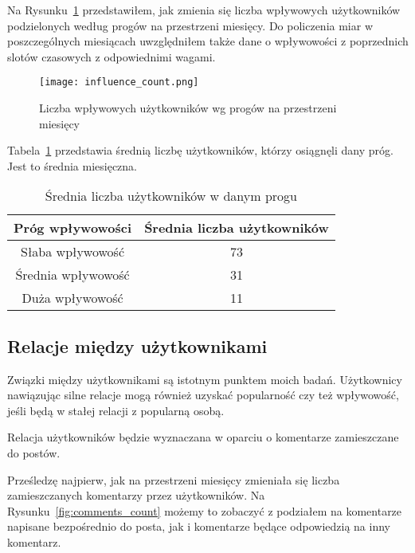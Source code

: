 \documentclass[polish,12pt]{aghthesis}
\begin{document}
Na Rysunku~\ref{fig:inf_count} przedstawiłem, jak zmienia się liczba wpływowych użytkowników podzielonych według progów na przestrzeni miesięcy. Do policzenia miar w poszczególnych miesiącach uwzględniłem także dane o wpływowości z poprzednich slotów czasowych z odpowiednimi wagami.

\begin{figure}[ht]
    \centering
    \texttt{[image: influence\_count.png]}
    \caption[Liczba wpływowych użytkowników wg progów na przestrzeni miesięcy]{Liczba wpływowych użytkowników wg progów na przestrzeni miesięcy}
    \label{fig:inf_count}
\end{figure}

\FloatBarrier

Tabela~\ref{tab:popul_count2} przedstawia średnią liczbę użytkowników, którzy osiągnęli dany próg. Jest to średnia miesięczna.

\begin{table}[h]
\centering
\begin{tabular}{|c|c|}
\hline
\textbf{Próg wpływowości} & \textbf{Średnia liczba użytkowników} \\
\hline
Słaba wpływowość & 73 \\
\hline
Średnia wpływowość & 31 \\
\hline
Duża wpływowość & 11 \\
\hline
\end{tabular}
\caption{Średnia liczba użytkowników w danym progu}
\label{tab:popul_count2}
\end{table}

\FloatBarrier



\subsection{Relacje między użytkownikami}

Związki między użytkownikami są istotnym punktem moich badań. Użytkownicy nawiązując silne relacje mogą również uzyskać popularność czy też wpływowość, jeśli będą w stałej relacji z popularną osobą.


Relacja użytkowników będzie wyznaczana w oparciu o komentarze zamieszczane do postów.

Prześledzę najpierw, jak na przestrzeni miesięcy zmieniała się liczba zamieszczanych komentarzy przez użytkowników. Na Rysunku~\ref{fig:comments_count} możemy to zobaczyć z podziałem na komentarze napisane bezpośrednio do posta, jak i komentarze będące odpowiedzią na inny komentarz.
\end{document}
